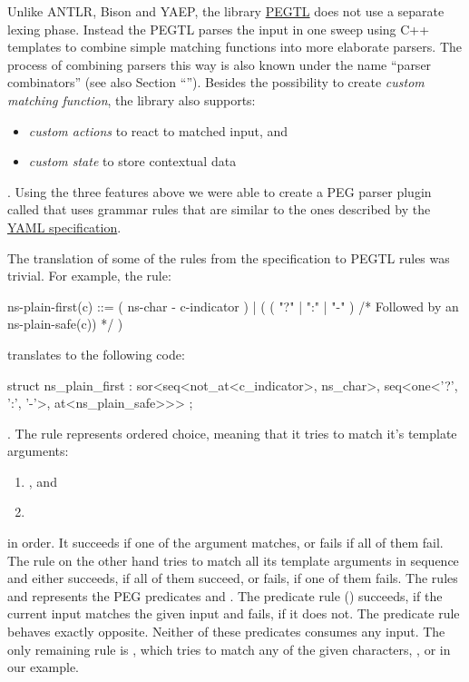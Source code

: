 Unlike \gls{ANTLR}, Bison and YAEP, the library \href{https://github.com/taocpp/PEGTL}{PEGTL} does not use a separate lexing phase. Instead the \gls{PEGTL} parses the input in one sweep using C++ templates to combine simple matching functions into more elaborate parsers. The process of combining parsers this way is also known under the name “parser combinators” (see also Section “”). Besides the possibility to create \emph{custom matching function}, the library also supports:

\begin{itemize}
  \item \emph{custom actions} to react to matched input, and
  \item \emph{custom state} to store contextual data
\end{itemize}

. Using the three features above we were able to create a \gls{PEG} parser plugin called \LinkYAyPEG{} that uses grammar rules that are similar to the ones described by the \href{http://yaml.org/spec/1.2/spec}{YAML specification}.

The translation of some of the rules from the  specification to \gls{PEGTL} rules was trivial. For example, the rule:

\begin{ccode}
ns-plain-first(c) ::= ( ns-char - c-indicator )
                    | ( ( "?" | ":" | "-" )
                        /* Followed by an ns-plain-safe(c)) */ )
\end{ccode}

translates to the following code:

\begin{cppcode}
struct ns_plain_first : sor<seq<not_at<c_indicator>, ns_char>,
                            seq<one<'?', ':', '-'>,
                                at<ns_plain_safe>>> {};
\end{cppcode}

. The rule  represents ordered choice, meaning that it tries to match it’s template arguments:

\begin{enumerate}
  \item {}, and
  \item {}
\end{enumerate}

in order. It succeeds if one of the argument matches, or fails if all of them fail. The rule  on the other hand tries to match all its template arguments in sequence and either succeeds, if all of them succeed, or fails, if one of them fails. The rules  and  represents the \gls{PEG} predicates \cc{&} and \cc{!}. The predicate rule  (\cc{&}) succeeds, if the current input matches the given input and fails, if it does not. The predicate rule  behaves exactly opposite. Neither of these predicates consumes any input. The only remaining rule is , which tries to match any of the given characters, ,  or  in our example.

